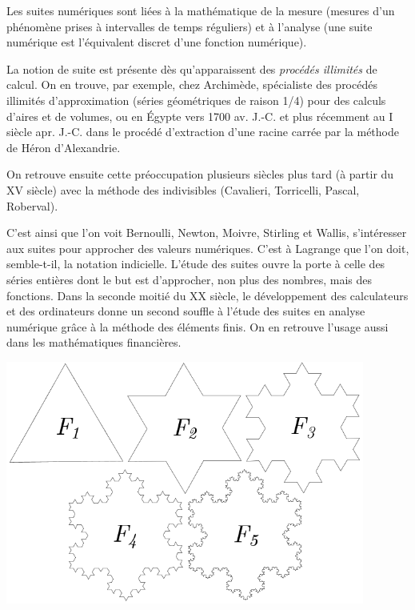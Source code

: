 \documentclass[a4paper,11pt]{article}
\begin{document}
\begin{chistoire}
Les suites numériques sont liées à la mathématique de la mesure (mesures d'un phénomène prises à intervalles de temps réguliers) et à l'analyse (une suite numérique est l'équivalent discret d'une fonction numérique).

\smallskip

La notion de suite est présente dès qu'apparaissent des \textit{procédés illimités} de calcul. On en trouve, par exemple, chez Archimède, spécialiste des procédés illimités d'approximation (séries géométriques de raison 1/4) pour des calculs d'aires et de volumes, ou en Égypte vers 1700 av. J.-C. et plus récemment au I siècle apr. J.-C. dans le procédé d'extraction d'une racine carrée par la méthode de Héron d'Alexandrie.

\smallskip

On retrouve ensuite cette préoccupation plusieurs siècles plus tard (à partir du XV siècle) avec la méthode des indivisibles (Cavalieri, Torricelli, Pascal, Roberval).

\smallskip

C'est ainsi que l'on voit Bernoulli, Newton, Moivre, Stirling et Wallis, s'intéresser aux suites pour approcher des valeurs numériques. C'est à Lagrange que l'on doit, semble-t-il, la notation indicielle. L'étude des suites ouvre la porte à celle des séries entières dont le but est d'approcher, non plus des nombres, mais des fonctions. Dans la seconde moitié du XX siècle, le développement des calculateurs et des ordinateurs donne un second souffle à l'étude des suites en analyse numérique grâce à la méthode des éléments finis. On en retrouve l'usage aussi dans les mathématiques financières.

\begin{center}
	\includegraphics[height=8cm]{chap02_flocons}
\end{center}
\end{chistoire}
\end{document}

